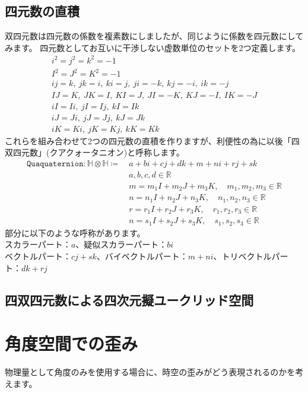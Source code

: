 \documentclass[a4paper,12pt,notitlepage]{jsreport}
\begin{document}
\section{四元数の直積}

双四元数は四元数の係数を複素数にしましたが、同じように係数を四元数にしてみます。
四元数としてお互いに干渉しない虚数単位のセットを2つ定義します。
\begin{gather}
i^2=j^2=k^2=-1\\
I^2=J^2=K^2=-1\\
ij=k,~jk=i,~ki=j,~ji=-k,~kj=-i,~ik=-j\\
IJ=K,~JK=I,~KI=J,~JI=-K,~KJ=-I,~IK=-J\\
iI=Ii,~jI=Ij,~kI=Ik\\
iJ=Ji,~jJ=Jj,~kJ=Jk\\
iK=Ki,~jK=Kj,~kK=Kk
\end{gather}
これらを組み合わせて2つの四元数の直積を作りますが、利便性の為に以後「四双四元数」(クアクォータニオン)と呼称します。
\begin{equation}
\begin{split}
\texttt{Quaquaternion}:\mathbb{H}\otimes\mathbb{H}\coloneq ~&a+bi+cj+dk+m+ni+rj+sk\\
&a,b,c,d\in\mathbb{R}\\
&m=m_1I+m_2J+m_3K,\quad m_1,m_2,m_3\in\mathbb{R}\\
&n=n_1I+n_2J+n_3K,\quad n_1,n_2,n_3\in\mathbb{R}\\
&r=r_1I+r_2J+r_3K,\quad r_1,r_2,r_3\in\mathbb{R}\\
&n=s_1I+s_2J+s_3K,\quad s_1,s_2,s_3\in\mathbb{R}
\end{split}
\end{equation}
部分に以下のような呼称があります。\\
スカラーパート：$a$、疑似スカラーパート：$bi$\\
ベクトルパート：$cj+sk$、バイベクトルパート：$m+ni$、トリベクトルパート：$dk+rj$\\

\section{四双四元数による四次元擬ユークリッド空間}

\chapter{角度空間での歪み}

物理量として角度のみを使用する場合に、時空の歪みがどう表現されるのかを考えます。
\end{document}
